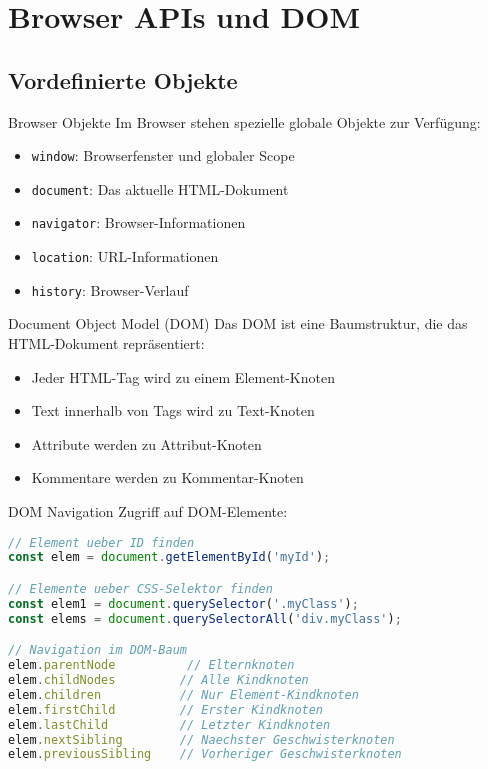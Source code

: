 \section{Browser APIs und DOM}

\subsection{Vordefinierte Objekte}

\begin{definition}{Browser Objekte}
    Im Browser stehen spezielle globale Objekte zur Verfügung:
    \begin{itemize}
        \item \texttt{window}: Browserfenster und globaler Scope
        \item \texttt{document}: Das aktuelle HTML-Dokument
        \item \texttt{navigator}: Browser-Informationen
        \item \texttt{location}: URL-Informationen
        \item \texttt{history}: Browser-Verlauf
    \end{itemize}
\end{definition}

\begin{concept}{Document Object Model (DOM)}
    Das DOM ist eine Baumstruktur, die das HTML-Dokument repräsentiert:
    \begin{itemize}
        \item Jeder HTML-Tag wird zu einem Element-Knoten
        \item Text innerhalb von Tags wird zu Text-Knoten
        \item Attribute werden zu Attribut-Knoten
        \item Kommentare werden zu Kommentar-Knoten
    \end{itemize}
\end{concept}

\begin{KR}{DOM Navigation}
Zugriff auf DOM-Elemente:
\begin{lstlisting}[language=JavaScript, style=basesmol]
// Element ueber ID finden
const elem = document.getElementById('myId');

// Elemente ueber CSS-Selektor finden
const elem1 = document.querySelector('.myClass');
const elems = document.querySelectorAll('div.myClass');

// Navigation im DOM-Baum
elem.parentNode          // Elternknoten
elem.childNodes         // Alle Kindknoten
elem.children           // Nur Element-Kindknoten
elem.firstChild         // Erster Kindknoten
elem.lastChild          // Letzter Kindknoten
elem.nextSibling        // Naechster Geschwisterknoten
elem.previousSibling    // Vorheriger Geschwisterknoten
\end{lstlisting}
\end{KR}

